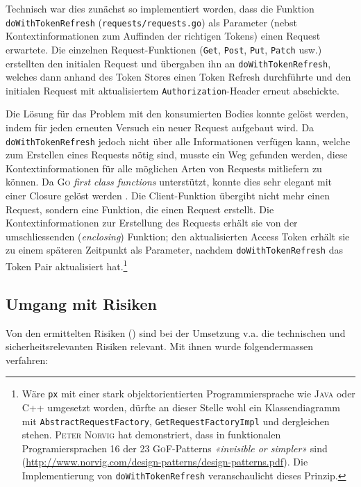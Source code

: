 Technisch war dies zunächst so implementiert worden, dass die Funktion \texttt{doWithToken\-Refresh} (\texttt{requests/requests.go}) als Parameter (nebst Kontextinformationen zum Auffinden der richtigen Tokens) einen Request erwartete. Die einzelnen Request-Funktionen (\texttt{Get}, \texttt{Post}, \texttt{Put}, \texttt{Patch} usw.) erstellten den initialen Request und übergaben ihn an \texttt{doWith\-Token\-Refresh}, welches dann anhand des Token Stores einen Token Refresh durchführte und den initialen Request mit aktualisiertem \texttt{Authorization}-Header erneut abschickte.

Die Lösung für das Problem mit den konsumierten Bodies konnte gelöst werden, indem für jeden erneuten Versuch ein neuer Request aufgebaut wird. Da \texttt{doWithTokenRefresh} jedoch nicht über alle Informationen verfügen kann, welche zum Erstellen eines Requests nötig sind, musste ein Weg gefunden werden, diese Kontextinformationen für alle möglichen Arten von Requests mitliefern zu können. Da \textsc{Go} \textit{first class functions} unterstützt, konnte dies sehr elegant mit einer Closure gelöst werden \cite[S. 136]{gopl}. Die Client-Funktion übergibt nicht mehr einen Request, sondern eine Funktion, die einen Request erstellt. Die Kontextinformationen zur Erstellung des Requests erhält sie von der umschliessenden (\textit{enclosing}) Funktion; den aktualisierten Access Token erhält sie zu einem späteren Zeitpunkt als Parameter, nachdem \texttt{doWithTokenRefresh} das Token Pair aktualisiert hat.\footnote{Wäre \texttt{px} mit einer stark objektorientierten Programmiersprache wie \textsc{Java} oder \textsc{C++} umgesetzt worden, dürfte an dieser Stelle wohl ein Klassendiagramm mit \texttt{AbstractRequestFactory}, \texttt{GetRequestFactoryImpl} und dergleichen stehen. \textsc{Peter Norvig} hat demonstriert, dass in funktionalen Programiersprachen 16 der 23 \textsc{GoF}-Patterns \textit{«invisible or simpler»} sind (\url{http://www.norvig.com/design-patterns/design-patterns.pdf}). Die Implementierung von \texttt{doWithTokenRefresh} veranschaulicht dieses Prinzip.}

\subsection{Umgang mit Risiken}

Von den ermittelten Risiken () sind bei der Umsetzung v.a. die technischen und sicherheitsrelevanten Risiken relevant. Mit ihnen wurde folgendermassen verfahren:

